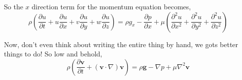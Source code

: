 \documentclass[10pt,a4paper,draft]{article}
\begin{document}
So the $x$ direction term for the momentum equation becomes,
\begin{equation}
\rho\left( 
	\frac{\partial u}{\partial t} + u\frac{\partial u}{\partial x} + v\frac{\partial u}{\partial y} + w\frac{\partial u}{\partial z}
\right)
= 
  \rho g_x 
- \frac{\partial p}{\partial x}
+ \mu\left(
	\frac{\partial^2 u}{\partial x^2} + \frac{\partial^2 u}{\partial y^2} + \frac{\partial^2 u}{\partial z^2}
	\right)	
\end{equation}


Now, don't even think about writing the entire thing by hand, we gots better things to do!
So low and behold,
\begin{equation}
\rho\left( 
	\frac{\partial \mathbf{v}}{\partial t} 
	+ \left(\mathbf{v}\cdot\nabla\right)\mathbf{v}
\right)
=
\rho\mathbf{g}
- \nabla p
+ \mu \nabla^2 \mathbf{v} 
\end{equation}
\end{document}
